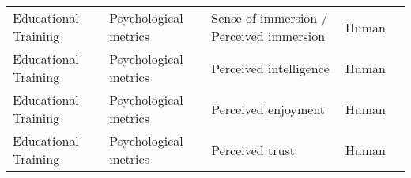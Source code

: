 \begin{small}
\begin{center}
\begin{longtable}{@{}p{}p{}p{}p{}p{}@{}}
Educational Training     & Psychological metrics & Sense of immersion / Perceived immersion                                                                                                                                                                    & Human     & \cite{lee2023generative} \\
Educational Training     & Psychological metrics & Perceived intelligence                                                                                                                                                                                      & Human     & \cite{Cheng2024LLMPoweredAT}                                                                                                                                                                                                                                                                                                                                                                                               \\
Educational Training     & Psychological metrics & Perceived enjoyment                                                                                                                                                                                         & Human     & \cite{Cheng2024LLMPoweredAT}                                                                                                                                                                                                                                                                                                                                                                                               \\
Educational Training     & Psychological metrics & Perceived trust                                                                                                                                                                                             & Human     & \cite{Cheng2024LLMPoweredAT}                                                                                                                                                                                                                                                                                                                                                                                               \\

\end{longtable}
\end{center}
\end{small}
